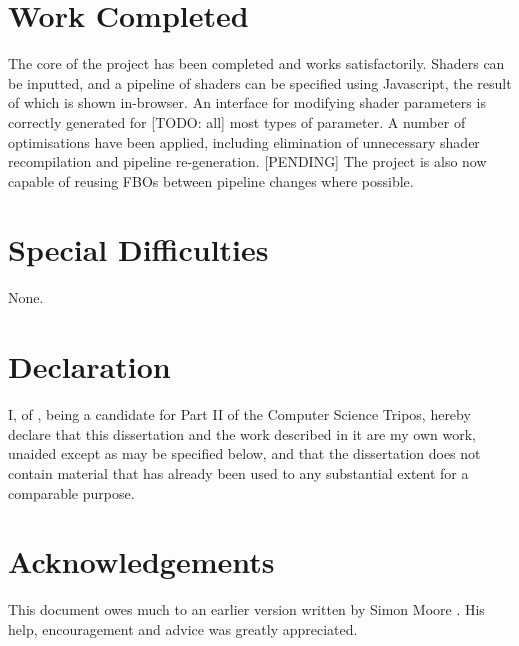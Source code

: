 \documentclass[12pt,twoside,notitlepage]{report}
\begin{document}
\section*{Work Completed}
The core of the project has been completed and works satisfactorily. Shaders can be inputted, and a pipeline of shaders can be specified using Javascript, the result of which is shown in-browser. An interface for modifying shader parameters is correctly generated for [TODO: all] most types of parameter. A number of optimisations have been applied, including elimination of unnecessary shader recompilation and pipeline re-generation. [PENDING] The project is also now capable of reusing FBOs between pipeline changes where possible.


\section*{Special Difficulties}
None.
 
\newpage
\section*{Declaration}

I, \name of \college, being a candidate for Part II of the Computer
Science Tripos, hereby declare
that this dissertation and the work described in it are my own work,
unaided except as may be specified below, and that the dissertation
does not contain material that has already been used to any substantial
extent for a comparable purpose.

\bigskip
{}

\medskip
{}

\cleardoublepage

\tableofcontents

\listoffigures

\newpage
\section*{Acknowledgements}

This document owes much to an earlier version written by Simon Moore
\cite{moore95}.  His help, encouragement and advice was greatly 
appreciated.


\cleardoublepage        %
\end{document}
